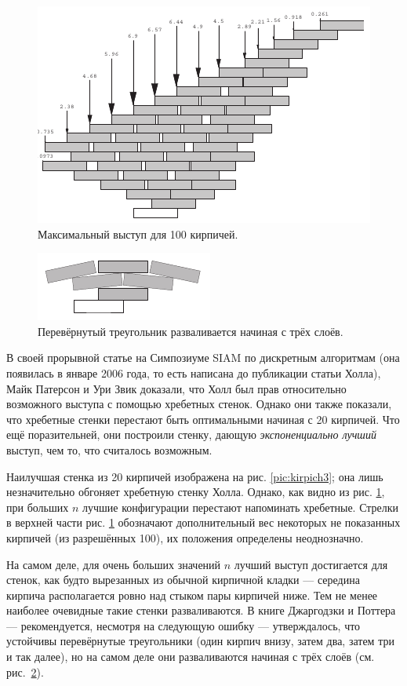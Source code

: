\begin{figure}[htb!]
\centering
\includegraphics[scale=1]{pics/kirpich4}
\caption{Максимальный выступ для 100 кирпичей.}
\label{pic:kirpich4}
\end{figure}

\begin{figure}[htb!]
\centering
\includegraphics[scale=1]{pics/kirpich5}
\caption{Перевёрнутый треугольник разваливается начиная с трёх слоёв.}
\label{pic:kirpich5}
\end{figure}

В своей прорывной статье \cite{47} на Симпозиуме SIAM по дискретным алгоритмам (она появилась в январе 2006 года, то есть написана до публикации статьи Холла), Майк Патерсон и Ури Звик доказали, что Холл был прав относительно возможного выступа с помощью хребетных стенок.
Однако они также показали, что хребетные стенки перестают быть оптимальными начиная с 20 кирпичей.
Что ещё поразительней, они построили стенку, дающую \emph{экспоненциально лучший} выступ, чем то, что считалось возможным.

Наилучшая стенка из 20 кирпичей изображена на рис. \ref{pic:kirpich3};
она лишь незначительно обгоняет хребетную стенку Холла.
Однако, как видно из рис. \ref{pic:kirpich4},  при больших $n$ лучшие конфигурации перестают напоминать хребетные.
Стрелки в верхней части рис. \ref{pic:kirpich4} обозначают дополнительный вес некоторых не показанных кирпичей (из разрешённых 100), их положения определены неоднозначно.

На самом деле, для очень больших значений $n$ лучший выступ достигается для стенок, как будто вырезанных из обычной кирпичной кладки --- середина кирпича располагается ровно над стыком пары кирпичей ниже.
Тем не менее наиболее очевидные такие стенки разваливаются.
В книге Джаргодзки и Поттера \cite{38} --- рекомендуется, несмотря на следующую ошибку --- утверждалось, что устойчивы перевёрнутые треугольники (один кирпич внизу, затем два, затем три и так далее), но на самом деле они разваливаются начиная с трёх слоёв (см. рис.~\ref{pic:kirpich5}).  

